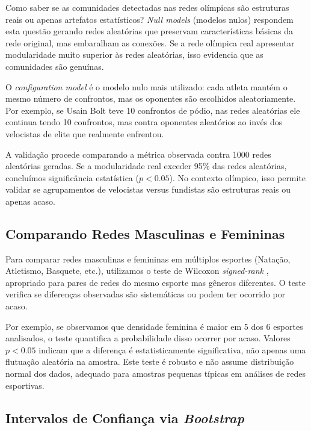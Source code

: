 Como saber se as comunidades detectadas nas redes olímpicas são estruturas reais ou apenas artefatos estatísticos? \textit{Null models} (modelos nulos) respondem esta questão gerando redes aleatórias que preservam características básicas da rede original, mas embaralham as conexões. Se a rede olímpica real apresentar modularidade muito superior às redes aleatórias, isso evidencia que as comunidades são genuínas.

O \textit{configuration model} \cite{Newman2018Networks} é o modelo nulo mais utilizado: cada atleta mantém o mesmo número de confrontos, mas os oponentes são escolhidos aleatoriamente. Por exemplo, se Usain Bolt teve 10 confrontos de pódio, nas redes aleatórias ele continua tendo 10 confrontos, mas contra oponentes aleatórios ao invés dos velocistas de elite que realmente enfrentou.

A validação procede comparando a métrica observada contra 1000 redes aleatórias geradas. Se a modularidade real exceder 95\% das redes aleatórias, concluímos significância estatística ($p < 0.05$). No contexto olímpico, isso permite validar se agrupamentos de velocistas versus fundistas são estruturas reais ou apenas acaso.

\subsection{Comparando Redes Masculinas e Femininas}

Para comparar redes masculinas e femininas em múltiplos esportes (Natação, Atletismo, Basquete, etc.), utilizamos o teste de Wilcoxon \textit{signed-rank} \cite{VanderPlas2016Python}, apropriado para pares de redes do mesmo esporte mas gêneros diferentes. O teste verifica se diferenças observadas são sistemáticas ou podem ter ocorrido por acaso.

Por exemplo, se observamos que densidade feminina é maior em 5 dos 6 esportes analisados, o teste quantifica a probabilidade disso ocorrer por acaso. Valores $p < 0.05$ indicam que a diferença é estatisticamente significativa, não apenas uma flutuação aleatória na amostra. Este teste é robusto e não assume distribuição normal dos dados, adequado para amostras pequenas típicas em análises de redes esportivas.

\subsection{Intervalos de Confiança via \textit{Bootstrap}}

